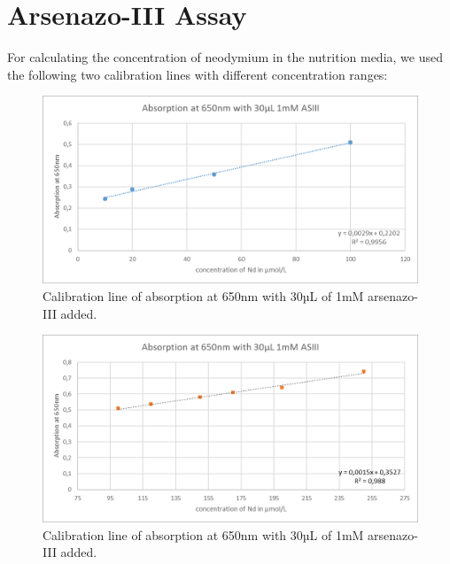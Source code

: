 \newpage

\section{Arsenazo-III Assay\authorA}

For calculating the concentration of neodymium in the nutrition media, we used the following two calibration lines with different concentration ranges:

\begin{figure}[H]
    \centering
    \includegraphics[width=1\textwidth]{media/images/absorption30_100}
    \caption{Calibration line of absorption at 650nm with 30µL of 1mM arsenazo-III added.}
    \label{fig:absorption30_100}
\end{figure}

\begin{figure}[h]
    \centering
    \includegraphics[width=1\textwidth]{media/images/absorption30_250}
    \caption{Calibration line of absorption at 650nm with 30µL of 1mM arsenazo-III added.}
    \label{fig:absorption30_250}
\end{figure}


